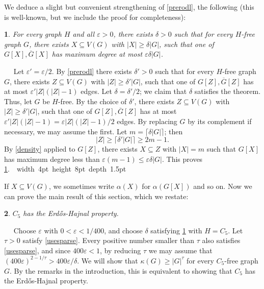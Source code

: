 \documentclass[titlepage,11pt]{article}
\newcommand\blackslug{\hbox{\hskip 1pt \vrule width 4pt height 8pt depth 1.5pt
        \hskip 1pt}}
\newcommand\bbox{\hfill \quad \blackslug \bigbreak}
\newcommand{\vare}{\varepsilon}
\newtheorem{thm}{}[section]
\newcommand{\Proof}{\noindent{\bf Proof.}\ \ }
\begin{document}
We deduce a slight but convenient strengthening of \ref{prerodl}, the following (this is well-known, but we include the proof for completeness):
\begin{thm}\label{rodl}
For every graph $H$ and all $\vare>0$, there exists $\delta>0$ such that for every $H$-free graph $G$, there exists $X\subseteq V(G)$
with $|X|\ge \delta|G|$, such that one of $G[X], \overline{G}[X]$ has maximum degree at most $\vare\delta|G|$.
\end{thm}
\Proof
Let $\vare'=\vare/2$. By \ref{prerodl} there exists $\delta'>0$ such that for every $H$-free graph $G$, there exists $Z\subseteq V(G)$
with $|Z|\ge \delta'|G|$, such that one of $G[Z], \overline{G}[Z]$ has  at most $\vare' |Z|(|Z|-1)$ edges. Let $\delta=\delta'/2$; we claim
that $\delta$ satisfies the theorem. Thus, let $G$ be $H$-free. By the choice of $\delta'$, there exists $Z\subseteq V(G)$
with $|Z|\ge \delta'|G|$, such that one of $G[Z], \overline{G}[Z]$ has  at most $\vare' |Z|(|Z|-1)=\vare |Z|(|Z|-1)/2$ edges. By replacing $G$
by its complement if necessary, we may assume the first. Let $m=\lceil \delta|G|\rceil$; then 
$$|Z|\ge \lceil\delta'|G|\rceil\ge 2m-1.$$
By \ref{density} applied to $G[Z]$, there exists
$X\subseteq Z$ with $|X|=m$ such that $G[X]$ has maximum degree less than $\vare (m-1)\le \vare\delta|G|$. This proves \ref{rodl}.~\bbox


If $X\subseteq V(G)$, we sometimes write $\alpha(X)$ for $\alpha(G[X])$ and so on.
Now we can prove the main result of this section, which we restate:
\begin{thm}\label{C5thm2}
$C_5$ has the Erd\H os-Hajnal property.
\end{thm}
\Proof
Choose $\vare$ with $0<\vare<1/400$, and choose
$\delta$ satisfying \ref{rodl} with $H=C_5$.
Let $\tau>0$ satisfy \ref{usesparse}. Every positive number smaller than $\tau$ also satisfies \ref{usesparse}, and 
since $400\vare<1$, by reducing $\tau$ we may assume that $(400\vare)^{2-1/\tau}>400\vare/\delta$.
We will show that $\kappa(G)\geq|G|^\tau$ for every $C_5$-free graph $G$.  By the remarks in the introduction, this is equivalent to showing that $C_5$ has the Erd\H os-Hajnal property.
\end{document}
